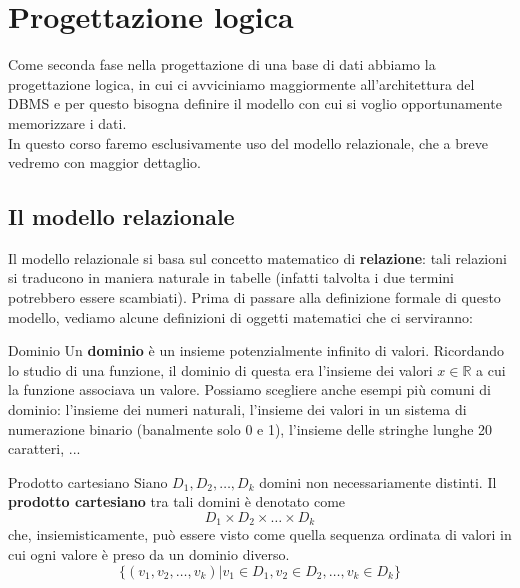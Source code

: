 \documentclass[12pt]{report}
\begin{document}
	\chapter{Progettazione logica}
	Come seconda fase nella progettazione di una base di dati abbiamo la progettazione logica, in cui ci avviciniamo maggiormente all'architettura del DBMS e per questo bisogna definire il modello con cui si voglio opportunamente memorizzare i dati.\\
	In questo corso faremo esclusivamente uso del modello relazionale, che a breve vedremo con maggior dettaglio.
	
	\section{Il modello relazionale}
	Il modello relazionale si basa sul concetto matematico di \textbf{relazione}: tali relazioni si traducono in maniera naturale in tabelle (infatti talvolta i due termini potrebbero essere scambiati).
	Prima di passare alla definizione formale di questo modello, vediamo alcune definizioni di oggetti matematici che ci serviranno:
	
	\begin{definizione}{Dominio}{}
		Un \textbf{dominio} è un insieme potenzialmente infinito di valori. Ricordando lo studio di una funzione, il dominio di questa era l'insieme dei valori $x\in \mathbb{R}$ a cui la funzione associava un valore.
		\smallbreak
		Possiamo scegliere anche esempi più comuni di dominio: l'insieme dei numeri naturali, l'insieme dei valori in un sistema di numerazione binario (banalmente solo 0 e 1), l'insieme delle stringhe lunghe 20 caratteri, ...
	\end{definizione}
	
	\begin{definizione}{Prodotto cartesiano}{}
		Siano $D_1, D_2, \dots, D_k$ domini non necessariamente distinti. Il \textbf{prodotto cartesiano} tra tali domini è denotato come
		\[
			D_1 \times D_2 \times \dots \times D_k
		\]
		che, insiemisticamente, può essere visto come quella sequenza ordinata di valori in cui ogni valore è preso da un dominio diverso.
		\[
			\{(v_1, v_2, \dots, v_k) | v_1 \in D_1, v_2 \in D_2, \dots, v_k \in D_k\}
		\]
	\end{definizione}
	
\end{document}
